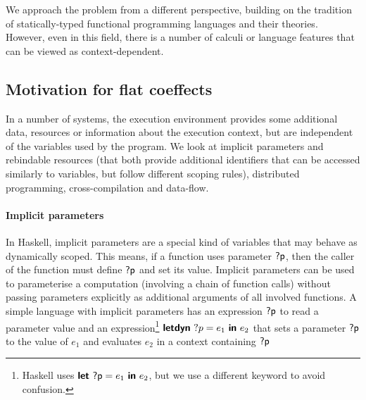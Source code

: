 We approach the problem from a different perspective, building on the tradition of 
statically-typed functional programming languages and their theories. However, even in this field,
there is a number of calculi or language features that can be viewed as context-dependent.


\subsection{Motivation for flat coeffects}

In a number of systems, the execution environment provides some additional data, resources or 
information about the execution context, but are independent of the variables used by the 
program. We look at implicit parameters and rebindable resources (that both provide additional
identifiers that can be accessed similarly to variables, but follow different scoping rules),
distributed programming, cross-compilation and data-flow.


\paragraph{Implicit parameters} In Haskell, implicit parameters \cite{app-implicit-parameters} are 
a special kind of variables that may behave as dynamically scoped. This means, if a function uses 
parameter $\textnormal{\sffamily ?p}$, then the caller of the function must define $\textnormal{\sffamily ?p}$ and set its value.
Implicit parameters can be used to parameterise a computation (involving a chain of function calls)
without passing parameters explicitly as additional arguments of all involved functions. A simple 
language with implicit parameters has an expression $\textnormal{\sffamily ?p}$ to read a parameter value and an 
expression\footnote{Haskell uses $\kvd{let}~\ident{?p} = e_1~\kvd{in}~e_2$, but we use a different keyword to 
avoid confusion.} $\kvd{letdyn}~?p = e_1~\kvd{in}~e_2$ that sets a parameter $\textnormal{\sffamily ?p}$ to the value of $e_1$ 
and evaluates $e_2$ in a context containing $\textnormal{\sffamily ?p}$

